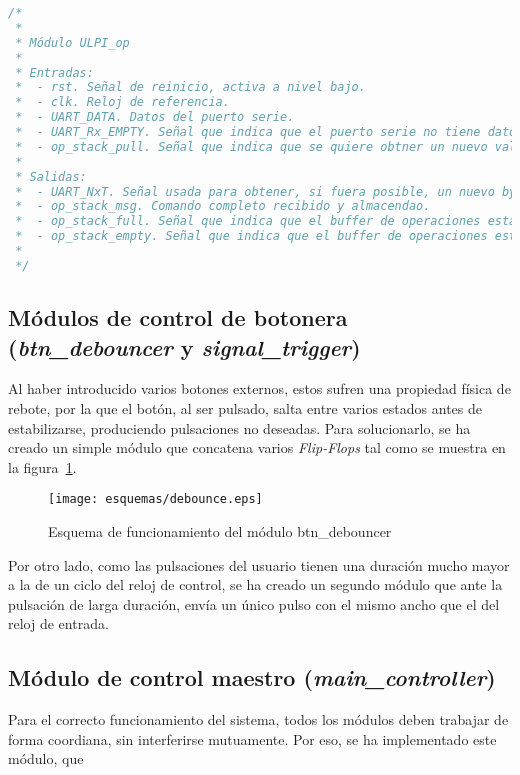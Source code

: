 \begin{lstlisting}[language=Verilog,
    caption={Entradas y salidas del módulo ULPI\_op.},
    label=src:resultados-modulos-ulpi-op]
/*
 *
 * Módulo ULPI_op
 *
 * Entradas:
 *  - rst. Señal de reinicio, activa a nivel bajo.
 *  - clk. Reloj de referencia.
 *  - UART_DATA. Datos del puerto serie.
 *  - UART_Rx_EMPTY. Señal que indica que el puerto serie no tiene datos disponibles.
 *  - op_stack_pull. Señal que indica que se quiere obtner un nuevo valor del buffer de operaciones.
 *
 * Salidas:
 *  - UART_NxT. Señal usada para obtener, si fuera posible, un nuevo byte.
 *  - op_stack_msg. Comando completo recibido y almacendao.
 *  - op_stack_full. Señal que indica que el buffer de operaciones está lleno.
 *  - op_stack_empty. Señal que indica que el buffer de operaciones está vacio.
 *
 */
\end{lstlisting}


\subsection{Módulos de control de botonera (\emph{btn\_debouncer} y \emph{signal\_trigger})}
Al haber introducido varios botones externos, estos sufren una propiedad física de rebote, por la que el botón, al ser pulsado, salta entre varios estados antes de estabilizarse, produciendo pulsaciones no deseadas. Para solucionarlo, se ha creado un simple módulo que concatena varios \emph{Flip-Flops} tal como se muestra en la figura~\ref{fig:esquema-debounce}.

\begin{figure}[htb]
    \centering
    \texttt{[image: esquemas/debounce.eps]}
    \caption{Esquema de funcionamiento del módulo btn\_debouncer}
    \label{fig:esquema-debounce}
\end{figure}

Por otro lado, como las pulsaciones del usuario tienen una duración mucho mayor a la de un ciclo del reloj de control, se ha creado un segundo módulo que ante la pulsación de larga duración, envía un único pulso con el mismo ancho que el del reloj de entrada.


\subsection{Módulo de control maestro (\emph{main\_controller})}
Para el correcto funcionamiento del sistema, todos los módulos deben trabajar de forma coordiana, sin interferirse mutuamente. Por eso, se ha implementado este módulo, que 

